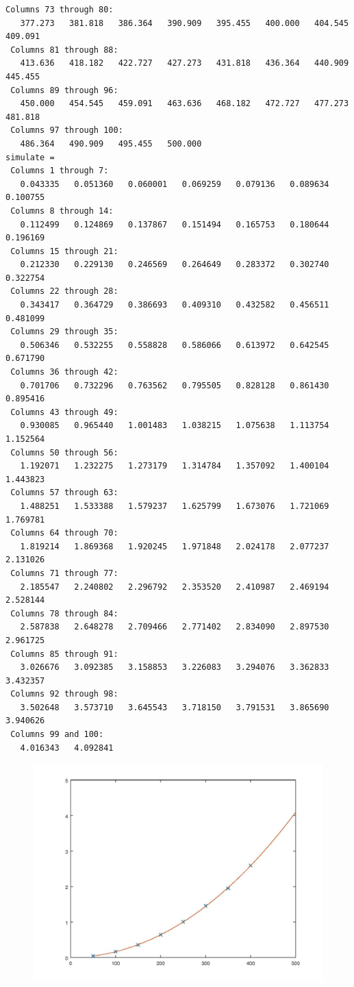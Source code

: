 \documentclass[10pt]{article}
\begin{document}
\begin{lstlisting}[language={},xleftmargin=5pt,frame=none]
 Columns 73 through 80:
   377.273   381.818   386.364   390.909   395.455   400.000   404.545   409.091
 Columns 81 through 88:
   413.636   418.182   422.727   427.273   431.818   436.364   440.909   445.455
 Columns 89 through 96:
   450.000   454.545   459.091   463.636   468.182   472.727   477.273   481.818
 Columns 97 through 100:
   486.364   490.909   495.455   500.000
simulate =
 Columns 1 through 7:
   0.043335   0.051360   0.060001   0.069259   0.079136   0.089634   0.100755
 Columns 8 through 14:
   0.112499   0.124869   0.137867   0.151494   0.165753   0.180644   0.196169
 Columns 15 through 21:
   0.212330   0.229130   0.246569   0.264649   0.283372   0.302740   0.322754
 Columns 22 through 28:
   0.343417   0.364729   0.386693   0.409310   0.432582   0.456511   0.481099
 Columns 29 through 35:
   0.506346   0.532255   0.558828   0.586066   0.613972   0.642545   0.671790
 Columns 36 through 42:
   0.701706   0.732296   0.763562   0.795505   0.828128   0.861430   0.895416
 Columns 43 through 49:
   0.930085   0.965440   1.001483   1.038215   1.075638   1.113754   1.152564
 Columns 50 through 56:
   1.192071   1.232275   1.273179   1.314784   1.357092   1.400104   1.443823
 Columns 57 through 63:
   1.488251   1.533388   1.579237   1.625799   1.673076   1.721069   1.769781
 Columns 64 through 70:
   1.819214   1.869368   1.920245   1.971848   2.024178   2.077237   2.131026
 Columns 71 through 77:
   2.185547   2.240802   2.296792   2.353520   2.410987   2.469194   2.528144
 Columns 78 through 84:
   2.587838   2.648278   2.709466   2.771402   2.834090   2.897530   2.961725
 Columns 85 through 91:
   3.026676   3.092385   3.158853   3.226083   3.294076   3.362833   3.432357
 Columns 92 through 98:
   3.502648   3.573710   3.645543   3.718150   3.791531   3.865690   3.940626
 Columns 99 and 100:
   4.016343   4.092841

\end{lstlisting}
\begin{figure}[!ht]
\includegraphics[width=\textwidth]{test-2.jpg}
\end{figure}
\end{document}
